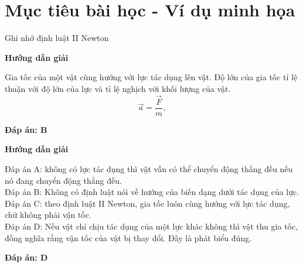 \section{Mục tiêu bài học - Ví dụ minh họa}
\begin{dang}{Ghi nhớ định luật II Newton}
	{	\begin{center}
			\textbf{Hướng dẫn giải}
		\end{center}
		
		Gia tốc của một vật cùng hướng với lực tác dụng lên vật. Độ lớn của gia tốc tỉ lệ thuận với độ lớn của lực và tỉ lệ nghịch với khối lượng của vật.
		\begin{equation}
			\vec{a}=\dfrac{\vec F}{m},
		\end{equation}
		
		\textbf{Đáp án: B}
	}
	{	\begin{center}
			\textbf{Hướng dẫn giải}
		\end{center}
		
		Đáp án A: không có lực tác dụng thì vật vẫn có thể chuyển động thẳng đều nếu nó đang chuyển động thẳng đều. \\
		Đáp án B: Không có định luật nói về hướng của biến dạng dưới tác dụng của lực. \\
		Đáp án C: theo định luật II Newton, gia tốc luôn cùng hướng với lực tác dụng, chứ không phải vận tốc. \\
		Đáp án D: Nếu vật chỉ chịu tác dụng của một lực khác không thì vật thu gia tốc, đồng nghĩa rằng vận tốc của vật bị thay đổi. Đây là phát biểu đúng. 
		
		\textbf{Đáp án: D}
	}
\end{dang}
